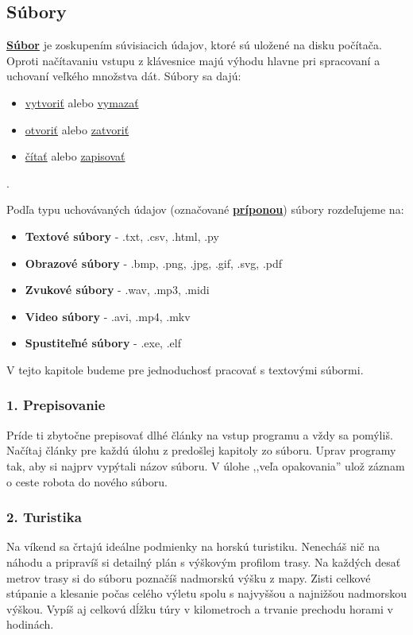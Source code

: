 \subsection{Súbory}
\underline{\textbf{Súbor}} je zoskupením súvisiacich údajov, ktoré sú uložené na disku počítača. Oproti načítavaniu vstupu z klávesnice majú výhodu hlavne pri spracovaní a uchovaní veľkého množstva dát. Súbory sa dajú: 
\begin{itemize}[noitemsep]
\item \underline{vytvoriť} alebo \underline{vymazať}
\item \underline{otvoriť} alebo \underline{zatvoriť}
\item \underline{čítať} alebo \underline{zapisovať}
\end{itemize}.

Podľa typu uchovávaných údajov (označované \underline{\textbf{príponou}}) súbory rozdeľujeme na:
\begin{itemize}[noitemsep]
\item \textbf{Textové súbory} - .txt, .csv, .html, .py
\item \textbf{Obrazové súbory} - .bmp, .png, .jpg, .gif, .svg, .pdf
\item \textbf{Zvukové súbory} - .wav, .mp3, .midi
\item \textbf{Video súbory} - .avi, .mp4, .mkv
\item \textbf{Spustiteľné súbory} - .exe, .elf
\end{itemize}
V tejto kapitole budeme pre jednoduchosť pracovať s textovými súbormi.

\subsubsection*{1. Prepisovanie}
Príde ti zbytočne prepisovať dlhé články na vstup programu a vždy sa pomýliš. Načítaj články pre každú úlohu z predošlej kapitoly zo súboru. Uprav programy tak, aby si najprv vypýtali názov súboru. V úlohe ,,veľa opakovania'' ulož záznam o ceste robota do nového súboru.


\subsubsection*{2. Turistika}
Na víkend sa črtajú ideálne podmienky na horskú turistiku. Nenecháš nič na náhodu a pripravíš si detailný plán s výškovým profilom trasy. Na každých desať metrov trasy si do súboru poznačíš nadmorskú výšku z mapy. Zisti celkové stúpanie a klesanie počas celého výletu spolu s najvyššou a najnižšou nadmorskou výškou. Vypíš aj celkovú dĺžku túry v kilometroch a trvanie prechodu horami v hodinách.


